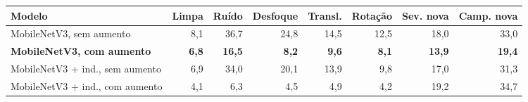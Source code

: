 \begin{tabular}{lrrrrrrr}
\toprule
Modelo & Limpa & Ruído & Desfoque & Transl. & Rotação & Sev. nova & Camp. nova \\
\midrule
MobileNetV3, sem aumento & 8,1 & 36,7 & 24,8 & 14,5 & 12,5 & 18,0 & 33,0 \\
\textbf{MobileNetV3, com aumento} & \textbf{6,8} & \textbf{16,5} & \textbf{8,2} & \textbf{9,6} & \textbf{8,1} & \textbf{13,9} & \textbf{19,4} \\
MobileNetV3 + ind., sem aumento & 6,9 & 34,0 & 20,1 & 13,9 & 9,8 & 17,0 & 31,3 \\
MobileNetV3 + ind., com aumento & 4,1 & 6,3 & 4,5 & 4,9 & 4,2 & 19,2 & 34,7 \\
\bottomrule
\end{tabular}
